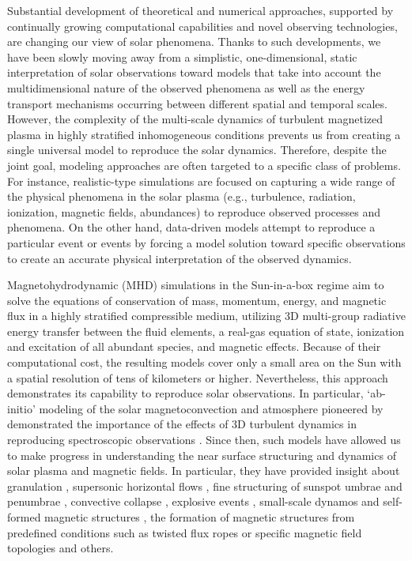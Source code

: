 \documentclass[]{article}
\begin{document}
Substantial development of theoretical and numerical approaches, supported by continually growing computational capabilities and novel observing technologies, are changing our view of solar phenomena. Thanks to such developments, we have been slowly moving away from a simplistic, one-dimensional, static interpretation of solar observations toward models that take into account the multidimensional nature of the observed phenomena as well as the energy transport mechanisms occurring between different spatial and temporal scales. However, the complexity of the multi-scale dynamics of turbulent magnetized plasma in highly stratified inhomogeneous conditions prevents us from creating a single universal model to reproduce the solar dynamics. Therefore, despite the joint goal, modeling approaches are often targeted to a specific class of problems. For instance, realistic-type simulations are focused on capturing a wide range of the physical phenomena in the solar plasma (e.g., turbulence, radiation, ionization, magnetic fields, abundances) to reproduce observed processes and phenomena.
On the other hand, data-driven models attempt to reproduce a particular event or events by forcing a model solution toward specific observations to create an accurate physical interpretation of the observed dynamics.

Magnetohydrodynamic (MHD) simulations in the Sun-in-a-box regime aim to solve the equations of conservation  of mass, momentum, energy, and magnetic flux in a highly stratified compressible medium, utilizing 3D multi-group radiative energy transfer between the fluid elements, a real-gas equation of state, ionization and excitation of all abundant species, and magnetic effects. Because of their computational cost, the resulting models cover only a small area on the Sun with a spatial resolution of tens of kilometers or higher. Nevertheless, this approach demonstrates its capability to reproduce solar observations. In particular, `ab-initio' modeling of the solar magnetoconvection and atmosphere pioneered by \cite{Nordlund1989} demonstrated the importance of the effects of 3D turbulent dynamics in reproducing spectroscopic observations \citep{Asplund2009}.  Since then, such models have allowed us to make progress in understanding the near surface structuring and dynamics of solar plasma and magnetic fields. In particular,  they have provided insight about granulation \citep[e.g.,][]{Stein2001}, supersonic horizontal flows \citep[e.g.,][]{Vitas2011}, fine structuring of sunspot umbrae \citep[e.g.,][]{Schuessler2006} and penumbrae \citep[e.g.,][]{Kitiashvili2009,Rempel2009,Rempel2009a,SiuTapia2018}, convective collapse \citep[e.g.,][]{Skartlien2000,Hewitt2014}, explosive events \citep[e.g.,][]{Kitiashvili2013,Danilovic2016,Chatterjee2016}, small-scale dynamos and self-formed magnetic structures \citep[e.g.,][]{Vogler2007,Kitiashvili2010,Kitiashvili2015,Stein2012,Rempel2014}, the formation of magnetic structures from predefined conditions such as twisted flux ropes or specific magnetic field topologies \citep[e.g.,][]{Rempel2009,Cheung2010,Fang2015} and others.
\end{document}
